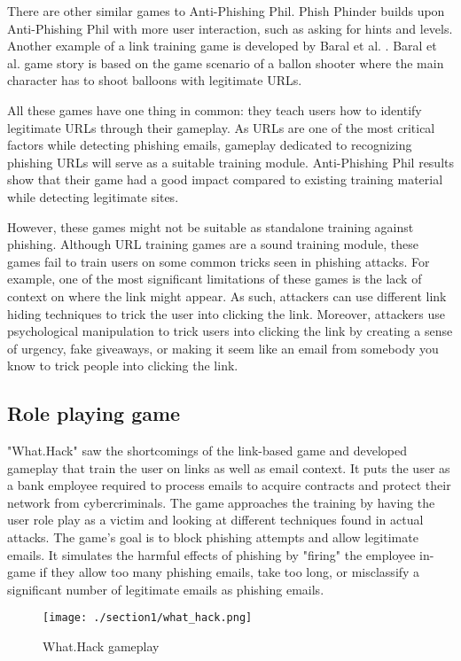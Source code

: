 There are other similar games to Anti-Phishing Phil. Phish Phinder \cite{phish_phinder} builds upon Anti-Phishing Phil with more user interaction, such as asking for hints and levels. Another example of a link training game is developed by Baral et al. \cite{gamified_approach}. Baral et al. game story is based on the game scenario of a ballon shooter where the main character has to shoot balloons with legitimate URLs.

All these games have one thing in common: they teach users how to identify legitimate URLs through their gameplay. As URLs are one of the most critical factors while detecting phishing emails, gameplay dedicated to recognizing phishing URLs will serve as a suitable training module. Anti-Phishing Phil results show that their game had a good impact compared to existing training material while detecting legitimate sites.

However, these games might not be suitable as standalone training against phishing. Although URL training games are a sound training module, these games fail to train users on some common tricks seen in phishing attacks. For example, one of the most significant limitations of these games is the lack of context on where the link might appear. As such, attackers can use different link hiding techniques to trick the user into clicking the link. Moreover, attackers use psychological manipulation to trick users into clicking the link by creating a sense of urgency, fake giveaways, or making it seem like an email from somebody you know to trick people into clicking the link.

\subsection{Role playing game}
"What.Hack" \cite{what_hack} saw the shortcomings of the link-based game and developed gameplay that train the user on links as well as email context. It puts the user as a bank employee required to process emails to acquire contracts and protect their network from cybercriminals. The game approaches the training by having the user role play as a victim and looking at different techniques found in actual attacks. The game's goal is to block phishing attempts and allow legitimate emails. It simulates the harmful effects of phishing by "firing" the employee in-game if they allow too many phishing emails, take too long, or misclassify a significant number of legitimate emails as phishing emails.

\begin{figure}[h]
    \centering
    \texttt{[image: ./section1/what\_hack.png]}
    \caption{What.Hack gameplay}
\end{figure}

